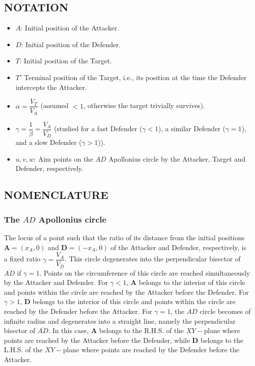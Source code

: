 \documentclass[final,5p,times,twocolumn]{elsarticle}
\begin{document}
\subsection{NOTATION}
\begin{itemize}
\item $A$: Initial position of the Attacker.
\item $D$: Initial position of the Defender.
\item $T$: Initial position of the Target.
\item $T'$ Terminal position of the Target, i.e., its position at the time the Defender intercepts the Attacker.
\item $\alpha=\dfrac{V_{T}}{V_{A}}$ (assumed $<1$, otherwise the target trivially survives).
\item $\gamma=\dfrac{1}{\beta}=\dfrac{V_{A}}{V_{D}}$ (studied for a fast Defender ($\gamma<1$), a similar Defender ($\gamma=1$), and a slow Defender ($\gamma>1$)).
\item $u, v, w$: Aim points on the $AD$ Apollonius circle by the Attacker, Target and Defender, respectively. 
\end{itemize}

\subsection{NOMENCLATURE}
\subsubsection{The $AD$ Apollonius circle}
The locus of a point such that the ratio of its distance from the initial positions $\boldsymbol{A}=(x_{A},0)$ and $\boldsymbol{D}=(-x_{A},0)$ of the Attacker and Defender, respectively, is a fixed ratio $\gamma=\dfrac{V_{A}}{V_{D}}$. This circle degenerates into the perpendicular bisector of $\overline{AD}$ if $\gamma=1$.
Points on the circumference of this circle are reached simultaneously by the Attacker and Defender. For $\gamma<1$, $\boldsymbol{A}$ belongs to the interior of this circle and points within the circle are reached by the Attacker before the Defender. For $\gamma>1$, $\boldsymbol{D}$ belongs to the interior of this circle and points within the circle are reached by the Defender before the Attacker. For $\gamma=1$, the $AD$ circle becomes of infinite radius and degenerates into a straight line, namely the perpendicular bisector of $\overline{AD}$. In this case, $\boldsymbol{A}$ belongs to the R.H.S. of the $XY-$plane where points are reached by the Attacker before the Defender, while $\boldsymbol{D}$ belongs to the L.H.S. of the $XY-$plane where points are reached by the Defender before the Attacker.   
\end{document}
